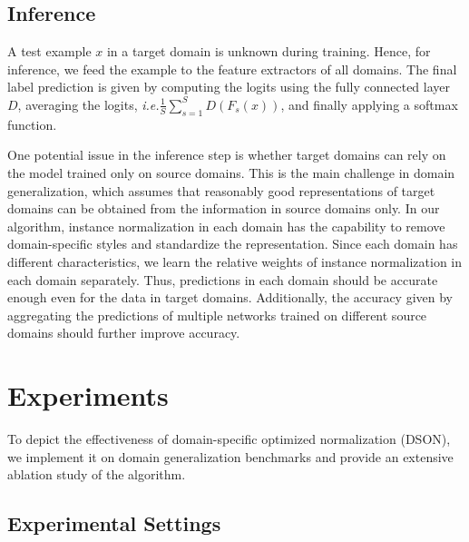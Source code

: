 \documentclass[runningheads]{llncs}
\newcommand\ie{\textit{i.e.}}
\begin{document}
\subsection{Inference}

A test example $x$ in a target domain is unknown during training.
Hence, for inference, we feed the example to the feature extractors of all domains.
The final label prediction is given by computing the logits using the fully connected layer $D$, averaging the logits, \ie $\frac{1}{S}\sum_{s=1}^{S}{D(F_s(x))}$, and finally applying a softmax function.

One potential issue in the inference step is whether target domains can rely on the model trained only on source domains.
This is the main challenge in domain generalization, which assumes that reasonably good representations of target domains can be obtained from the information in source domains only. 
{\color{black}
In our algorithm, instance normalization in each domain has the capability to remove domain-specific styles and standardize the representation.}
Since each domain has different characteristics, we learn the relative weights of instance normalization in each domain separately.
Thus, predictions in each domain should be accurate enough even for the data in target domains. Additionally, the accuracy given by aggregating the predictions of multiple networks trained on different source domains should further improve accuracy.
 


\section{Experiments}
\label{sec:experiments}

To depict the effectiveness of domain-specific optimized normalization (DSON), we implement it on domain generalization benchmarks and provide an extensive ablation study of the algorithm.


\subsection{Experimental Settings}
\end{document}
